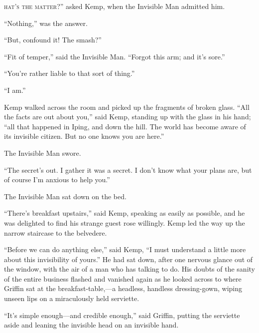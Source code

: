 \label{ch:19}
\begin{ChapterStart}
\vspace*{2\nbs}

\vspace{1.5\nbs}
\vspace{0.75\nbs}
\end{ChapterStart}

\kern-4pt\textsc{hat’s the matter}?” asked Kemp, when the Invisible Man admitted him.

“Nothing,” was the answer.

“But, confound it! The smash?”

“Fit of temper,” said the Invisible Man. “Forgot this arm; and it’s sore.”

“You’re rather liable to that sort of thing.”

“I am.”

Kemp walked across the room and picked up the fragments of broken glass. “All the facts are out about you,” said Kemp, standing up with the glass in his hand; “all that happened in Iping, and down the hill. The world has become aware of its invisible citizen. But no one knows you are here.”

The Invisible Man swore.

“The secret’s out. I gather it was a secret. I don’t know what your plans are, but of course I’m anxious to help you.”

The Invisible Man sat down on the bed.

“There’s breakfast upstairs,” said Kemp, speaking as easily as possible, and he was delighted to find his strange guest rose willingly. Kemp led the way up the narrow staircase to the belvedere.

“Before we can do anything else,” said Kemp, “I must understand a little more about this invisibility of yours.” He had sat down, after one nervous glance out of the window, with the air of a man who has talking to do. His doubts of the sanity of the entire business flashed and vanished again as he looked across to where Griffin sat at the breakfast-table,—a headless, handless dressing-gown, wiping unseen lips on a miraculously held serviette.

“It’s simple enough—and credible enough,” said Griffin, putting the serviette aside and leaning the invisible head on an invisible hand.


